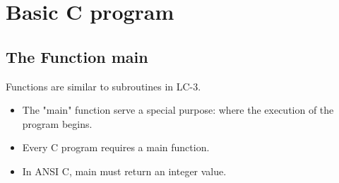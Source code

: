 \section{Basic C program}
\subsection{The Function main}
Functions are similar to subroutines in LC-3. 
\begin{itemize}
    \item The "main" function serve a special purpose: where the execution of the program begins. 
    \item Every C program requires a main function.
    \item In ANSI C, main must return an integer value.
\end{itemize}

